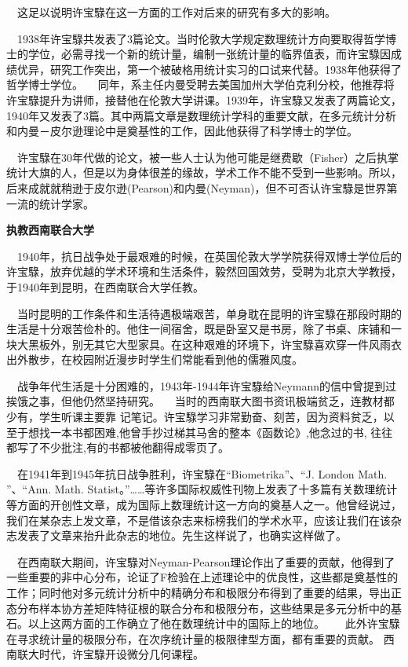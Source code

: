 $\quad$这足以说明许宝騄在这一方面的工作对后来的研究有多大的影响。

$\quad$1938年许宝騄共发表了3篇论文。当时伦敦大学规定数理统计方向要取得哲学博士的学位，必需寻找一个新的统计量，编制一张统计量的临界值表，而许宝騄因成绩优异，研究工作突出，第一个被破格用统计实习的口试来代替。1938年他获得了哲学博士学位。
$\quad$同年，系主任内曼受聘去美国加州大学伯克利分校，他推荐将许宝騄提升为讲师，接替他在伦敦大学讲课。1939年，许宝騄又发表了两篇论文，1940年又发表了3篇。其中两篇文章是数理统计学科的重要文献，在多元统计分析和内曼－皮尔逊理论中是奠基性的工作，因此他获得了科学博士的学位。

$\quad$许宝騄在30年代做的论文，被一些人士认为他可能是继费歇（Fisher）之后执掌统计大旗的人，但是以为身体很差的缘故，学术工作不能不受到一些影响。所以，后来成就就稍逊于皮尔逊(Pearson)和内曼(Neyman)，但不可否认许宝騄是世界第一流的统计学家。

\textbf{执教西南联合大学}

$\quad$1940年，抗日战争处于最艰难的时候，在英国伦敦大学学院获得双博士学位后的许宝騄，放弃优越的学术环境和生活条件，毅然回国效劳，受聘为北京大学教授，于1940年到昆明，在西南联合大学任教。

$\quad$当时昆明的工作条件和生活待遇极端艰苦，单身耽在昆明的许宝騄在那段时期的生活是十分艰苦俭朴的。他住一间宿舍，既是卧室又是书房，除了书桌、床铺和一块大黑板外，别无其它大型家具。在这种艰难的环境下，许宝騄喜欢穿一件风雨衣出外散步，在校园附近漫步时学生们常能看到他的儒雅风度。

$\quad$战争年代生活是十分困难的，1943年-1944年许宝騄给Neymann的信中曾提到过挨饿之事，但他仍然坚持研究。
$\quad$当时的西南联大图书资讯极端贫乏，连教材都少有，学生听课主要靠 记笔记。许宝騄学习非常勤奋、刻苦，因为资料贫乏，以至于想找一本书都困难,他曾手抄过梯其马舍的整本《函数论》,他念过的书, 往往都写了不少批注,有的书都被他翻得成零页了。

$\quad$在1941年到1945年抗日战争胜利，许宝騄在“Biometrika”、“J. London Math. ”、“Ann. Math. Statist。”……等许多国际权威性刊物上发表了十多篇有关数理统计等方面的开创性文章，成为国际上数理统计这一方向的奠基人之一。他曾经说过，我们在某杂志上发文章，不是借该杂志来标榜我们的学术水平，应该让我们在该杂志发表了文章来抬升此杂志的地位。先生这样说了，也确实这样做了。

$\quad$在西南联大期间，许宝騄对Neyman-Pearson理论作出了重要的贡献，他得到了一些重要的非中心分布，论证了F检验在上述理论中的优良性，这些都是奠基性的工作；同时他对多元统计分析中的精确分布和极限分布得到了重要的结果，导出正态分布样本协方差矩阵特征根的联合分布和极限分布，这些结果是多元分析中的基石。以上这两方面的工作确立了他在数理统计中的国际上的地位。　
$\quad$此外许宝騄在寻求统计量的极限分布，在次序统计量的极限律型方面，都有重要的贡献。
西南联大时代，许宝騄开设微分几何课程。

